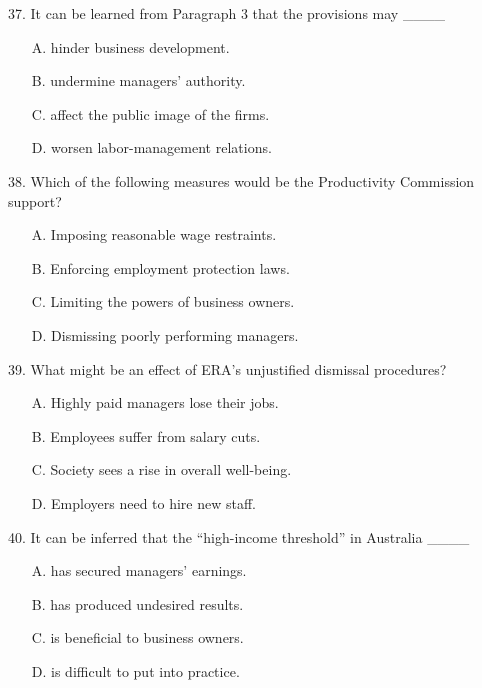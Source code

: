 \documentclass[UTF8,11pt]{ctexart}
\begin{document}
37. It can be learned from Paragraph 3 that the provisions may \_\_\_\_


\begin{itemize}[leftmargin=2em,itemsep=.2em,topsep=.4em]\item[A.] hinder business development.
\item[B.] undermine managers’ authority.
\item[C.] affect the public image of the firms.
\item[D.] worsen labor-management relations.
\end{itemize}

38. Which of the following measures would be the Productivity Commission support?


\begin{itemize}[leftmargin=2em,itemsep=.2em,topsep=.4em]\item[A.] Imposing reasonable wage restraints.
\item[B.] Enforcing employment protection laws.
\item[C.] Limiting the powers of business owners.
\item[D.] Dismissing poorly performing managers.
\end{itemize}

39. What might be an effect of ERA’s unjustified dismissal procedures?


\begin{itemize}[leftmargin=2em,itemsep=.2em,topsep=.4em]\item[A.] Highly paid managers lose their jobs.
\item[B.] Employees suffer from salary cuts.
\item[C.] Society sees a rise in overall well-being.
\item[D.] Employers need to hire new staff.
\end{itemize}

40. It can be inferred that the “high-income threshold” in Australia \_\_\_\_


\begin{itemize}[leftmargin=2em,itemsep=.2em,topsep=.4em]\item[A.] has secured managers’ earnings.
\item[B.] has produced undesired results.
\item[C.] is beneficial to business owners.
\item[D.] is difficult to put into practice.
\end{itemize}
\end{document}
